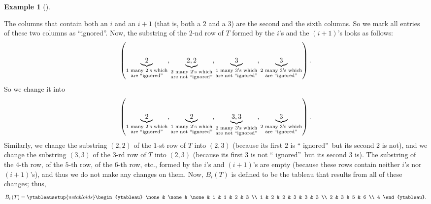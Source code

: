 \documentclass[numbers=enddot,12pt,final,onecolumn,notitlepage]{scrartcl}%
\theoremstyle{definition}
\newtheorem{exmp}[theo]{Example}
\newenvironment{example}[1][]
{\begin{exmp}[#1]\begin{leftbar}}
{\end{leftbar}\end{exmp}}
\begin{document}
\begin{example}
The columns that contain both an $i$ and an $i+1$ (that is, both a $2$ and a
$3$) are the second and the sixth columns. So we mark all entries of these two
columns as \textquotedblleft ignored\textquotedblright. Now, the substring of
the $2$-nd row of $T$ formed by the $i$'s and the $\left(  i+1\right)  $'s
looks as follows:%
\[
\left(  \underbrace{2}_{\substack{1\text{ many }2\text{'s which}\\\text{are
\textquotedblleft ignored\textquotedblright}}},\underbrace{2,2}%
_{\substack{2\text{ many }2\text{'s which}\\\text{are not \textquotedblleft
ignored\textquotedblright}}},\underbrace{3}_{\substack{1\text{ many }3\text{'s
which}\\\text{are not \textquotedblleft ignored\textquotedblright}%
}},\underbrace{3}_{\substack{2\text{ many }3\text{'s which}\\
\text{are \textquotedblleft ignored\textquotedblright}}}\right)  .
\]
So we change it into%
\[
\left(  \underbrace{2}_{\substack{1\text{ many }2\text{'s which}\\\text{are
\textquotedblleft ignored\textquotedblright}}},\underbrace{2}%
_{\substack{1\text{ many }2\text{'s which}\\\text{are not \textquotedblleft
ignored\textquotedblright}}},\underbrace{3,3}_{\substack{2\text{ many
}3\text{'s which}\\\text{are not \textquotedblleft ignored\textquotedblright}%
}},\underbrace{3}_{\substack{2\text{ many }3\text{'s which}\\
\text{are \textquotedblleft ignored\textquotedblright}}}\right)  .
\]
Similarly, we change the substring $\left(  2,2\right)  $ of the $1$-st row of
$T$ into $\left(  2,3\right)  $ (because its first $2$ is \textquotedblleft
ignored\textquotedblright\ but its second $2$ is not), and we change the
substring $\left(  3,3\right)  $ of the $3$-rd row of $T$ into $\left(
2,3\right)  $ (because its first $3$ is not \textquotedblleft
ignored\textquotedblright\ but its second $3$ is). The substring of the $4$-th
row, of the $5$-th row, of the $6$-th row, etc., formed by the $i$'s and
$\left(  i+1\right)  $'s are empty (because these rows contain
neither $i$'s nor
$\left(  i+1\right)  $'s), and thus we do not make any changes on them. Now,
$B_{i}\left(  T\right)  $ is defined to be the tableau that results from all
of these changes; thus,%
\[
B_{i}\left(  T\right)  =%
\ytableausetup{notabloids}
\begin{ytableau}
\none& \none& \none& 1 & 1 & 2 & 3 \\
1 & 2 & 2 & 3 & 3 & 3 \\
2 & 3 & 5 & 6 \\
4
\end{ytableau}%
.
\]

\end{example}
\end{document}
